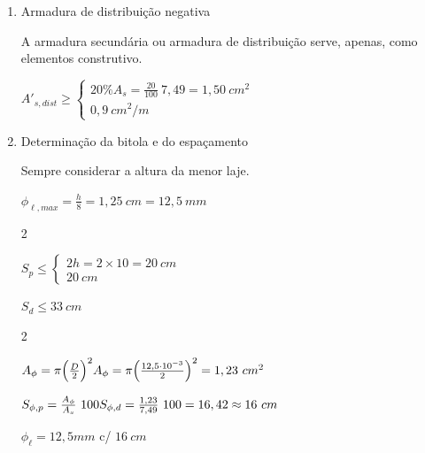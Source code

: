 \begin{resposta}
\begin{enumerate}[start=9]
\begin{enumerate}
            \item Armadura de distribuição negativa \cite[item 20.1]{nbr6118}
            
            A armadura secundária ou armadura de distribuição serve, apenas, como elementos construtivo.
            
            $A'_{s,dist} \geq \begin{cases}
                20\%A_s = \frac{20}{100} \ 7,49 = 1,50 \ cm^2 \\
                0,9 \ cm^2/m
            \end{cases}$ \newline

            \item Determinação da bitola e do espaçamento
            
            \begin{observacao}
                Sempre considerar a altura da menor laje.
            \end{observacao}
            
            $\phi_{\ell, max} = \frac{h}{8} = 1,25 \ cm = 12,5 \ mm$ \newline

            \begin{multicols}{2}

            $S_p \leq \begin{cases}
                2h = 2 \times 10 = 20 \ cm \\
                20 \ cm
            \end{cases}$ \newline

            $S_d \leq 33 \ cm$ \newline
            \end{multicols}


            \begin{multicols}{2}

            $A_{\phi} = \pi \Big(\frac{D}{2}\Big)^2 \newline A_{\phi} = \pi \Big(\frac{12,5 \cdot 10^{-3}}{2}\Big)^2 = 1,23 \ cm^2$\newline

            $S_{\phi, p} = \frac{A_{\phi}}{A_s}\ 100 \newline S_{\phi, d} = \frac{1,23}{7,49} \ 100 = 16,42 \approx 16 \ cm$ \newline

            $\phi_\ell = 12,5 mm$ c/ $16 \ cm$


\end{multicols}
\end{enumerate}
\end{enumerate}
\end{resposta}
